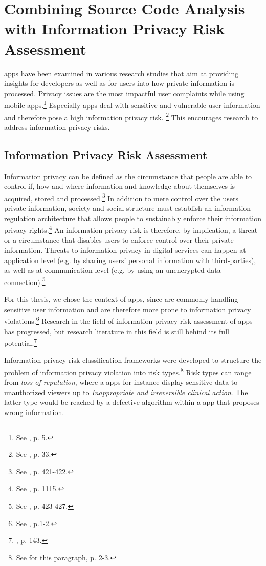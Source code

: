 \section{Combining Source Code Analysis with Information Privacy Risk Assessment}

\mH apps have been examined in various research studies that aim at providing insights for developers as well as for users into how private information is processed.
Privacy issues are the most impactful user complaints while using mobile apps.\footnote{See \cite{Khalid2015}, p. 5.}
Especially \mH apps deal with sensitive and vulnerable user information and therefore pose a high information privacy risk. \footnote{See \cite{Kumar2013}, p. 33.}
This encourages research to address information privacy risks.

\subsection{Information Privacy Risk Assessment}

Information privacy can be defined as the circumstance that people are able to control if, how and where information and knowledge about themselves is acquired, stored and processed.\footnote{See \cite{Fischer1998}, p. 421-422.}
In addition to mere control over the users private information, society and social structure must establish an information regulation architecture that allows people to sustainably enforce their information privacy rights.\footnote{See \cite{Solove2002}, p. 1115.}
An information privacy risk is therefore, by implication, a threat or a circumstance that disables users to enforce control over their private information.
Threats to information privacy in digital services can happen at application level (e.g. by sharing users' personal information with third-parties), as well as at communication level (e.g. by using an unencrypted data connection).\footnote{See \cite{Fischer1998}, p. 423-427.}

For this thesis, we chose the context of \mH apps, since \mH are commonly handling sensitive user information and are therefore more prone to information privacy violations.\footnote{See \cite{Huckvale2015}, p.1-2.}
Research in the field of information privacy risk assessment of \mH apps has progressed, but research literature in this field is still behind its full potential.\footnote{\cite{Arora2014}, p. 143.}

Information privacy risk classification frameworks were developed to structure the problem of information privacy violation into risk types.\footnote{See for this paragraph\cite{Lewis2014}, p. 2-3.}
Risk types can range from \textit{loss of reputation}, where a \mH apps for instance display sensitive data to unauthorized viewers up to \textit{Inappropriate and irreversible clinical action}. 
The latter type would be reached by a defective algorithm within a \mH app that proposes wrong information.

